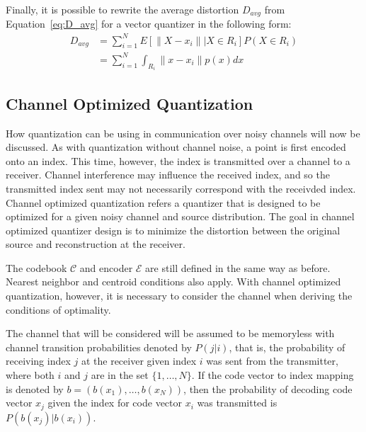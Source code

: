 Finally, it is possible to rewrite the average distortion $D_{avg}$ from Equation~\ref{eq:D_avg} for a vector quantizer in the following form:
\begin{align}
D_{avg} &= \sum_{i=1}^{N} E[ \|X - x_i\| | X \in R_i] P(X \in R_i) \\
&= \sum_{i=1}^{N} \int_{R_i} \|x - x_i\| p(x) dx
\end{align}

\subsection{Channel Optimized Quantization}
\label{sec:channel_optimized}
How quantization can be using in communication over noisy channels will now be discussed. As with quantization without channel noise, a point is first encoded onto an index. This time, however, the index is transmitted over a channel to a receiver. Channel interference may influence the received index, and so the transmitted index sent may not necessarily correspond with the receivded index. Channel optimized quantization refers a quantizer that is designed to be optimized for a given noisy channel and source distribution. The goal in channel optimized quantizer design is to minimize the distortion between the original source and reconstruction at the receiver.

The codebook $\mathcal{C}$ and encoder $\mathcal{E}$ are still defined in the same way as before. Nearest neighbor and centroid conditions also apply. With channel optimized quantization, however, it is necessary to consider the channel when deriving the conditions of optimality.

The channel that will be considered will be assumed to be memoryless with channel transition probabilities denoted by $P(j|i)$, that is, the probability of receiving index $j$ at the receiver given index $i$ was sent from the transmitter, where both $i$ and $j$ are in the set $\{1,\ldots,N\}$. If the code vector to index mapping is denoted by $b = (b(x_1),\ldots,b(x_N))$, then the probability of decoding code vector $x_j$ given the index for code vector $x_i$ was transmitted is $P(b(x_j)|b(x_i))$.

